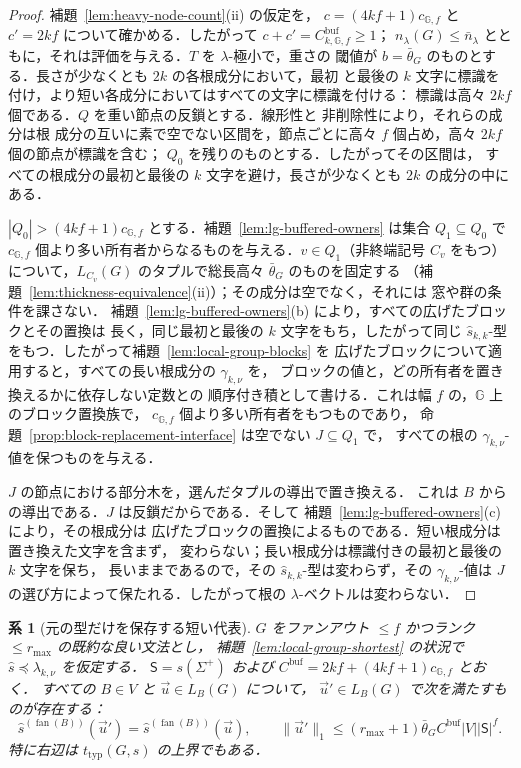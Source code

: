 \documentclass[11pt,a4paper]{ltjsarticle}
\numberwithin{equation}{section}
\theoremstyle{plain}
\newtheorem{corollary}[theorem]{系}
\theoremstyle{definition}
\theoremstyle{remark}
\newcommand{\tuple}[1]{\vec{#1}}
\newcommand{\fan}{\operatorname{fan}}
\theoremstyle{plain}
\begin{document}
\begin{proof}
補題~\ref{lem:heavy-node-count}(ii) の仮定を，
$c=(4kf+1)c_{{\mathbb G},f}$ と $c'=2kf$ について確かめる．したがって $c+c'=C^{\mathrm{buf}}_{k,{\mathbb G},f}\ge1$；
$n_\lambda(G)\le\bar n_\lambda$ とともに，それは評価を与える．$T$ を $\lambda$-極小で，重さの
閾値が $b=\bar\theta_G$ のものとする．長さが少なくとも $2k$ の各根成分において，最初
と最後の $k$ 文字に標識を付け，より短い各成分においてはすべての文字に標識を付ける：
標識は高々 $2kf$ 個である．$Q$ を重い節点の反鎖とする．線形性と
非削除性により，それらの成分は根
成分の互いに素で空でない区間を，節点ごとに高々 $f$ 個占め，高々 $2kf$ 個の節点が標識を含む；
$Q_0$ を残りのものとする．したがってその区間は，
すべての根成分の最初と最後の $k$ 文字を避け，長さが少なくとも $2k$ の成分の中にある．

$|Q_0|>(4kf+1)c_{{\mathbb G},f}$ とする．補題~\ref{lem:lg-buffered-owners} は集合
$Q_1\subseteq Q_0$ で $c_{{\mathbb G},f}$ 個より多い所有者からなるものを与える．$v\in Q_1$（非終端記号
$C_v$ をもつ）について，$L_{C_v}(G)$ のタプルで総長高々 $\bar\theta_G$ のものを固定する
（補題~\ref{lem:thickness-equivalence}(ii)）；その成分は空でなく，それには
窓や群の条件を課さない．
補題~\ref{lem:lg-buffered-owners}(b) により，すべての広げたブロックとその置換は
長く，同じ最初と最後の $k$ 文字をもち，したがって同じ
$\widehat s_{k,k}$-型をもつ．したがって補題~\ref{lem:local-group-blocks} を
広げたブロックについて適用すると，すべての長い根成分の $\gamma_{k,\nu}$ を，
ブロックの値と，どの所有者を置き換えるかに依存しない定数との
順序付き積として書ける．これは幅 $f$ の，${\mathbb G}$ 上のブロック置換族で，
$c_{{\mathbb G},f}$ 個より多い所有者をもつものであり，
命題~\ref{prop:block-replacement-interface} は空でない $J\subseteq Q_1$ で，
すべての根の $\gamma_{k,\nu}$-値を保つものを与える．

$J$ の節点における部分木を，選んだタプルの導出で置き換える．
これは $B$ からの導出である．$J$ は反鎖だからである．そして
補題~\ref{lem:lg-buffered-owners}(c) により，その根成分は
広げたブロックの置換によるものである．短い根成分は置き換えた文字を含まず，
変わらない；長い根成分は標識付きの最初と最後の $k$ 文字を保ち，
長いままであるので，その $\widehat s_{k,k}$-型は変わらず，その
$\gamma_{k,\nu}$-値は $J$ の選び方によって保たれる．したがって根の
$\lambda$-ベクトルは変わらない．
\end{proof}

\begin{corollary}[元の型だけを保存する短い代表]
\label{cor:lg-type-level-shortest}
$G$ をファンアウト $\le f$ かつランク $\le r_{\max}$ の既約な良い文法とし，
補題~\ref{lem:local-group-shortest} の状況で
$\widehat s\preceq\lambda_{k,\nu}$ を仮定する．
$\mathsf S=s(\Sigma^+)$ および
$C^{\mathrm{buf}}=2kf+(4kf+1)c_{{\mathbb G},f}$ とおく．
すべての $B\in V$ と $\tuple u\in L_B(G)$ について，
$\tuple u'\in L_B(G)$ で次を満たすものが存在する：
\[
 \widehat s^{(\fan(B))}(\tuple u')=
 \widehat s^{(\fan(B))}(\tuple u),\qquad
 \|\tuple u'\|_1\le
 (r_{\max}+1)\bar\theta_G C^{\mathrm{buf}}|V||\mathsf S|^f.
\]
特に右辺は $t_{\mathrm{typ}}(G,s)$ の上界でもある．
\end{corollary}
\end{document}
